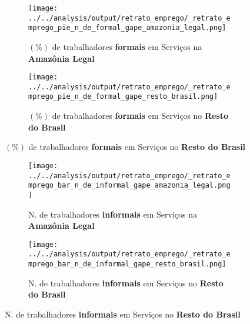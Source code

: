 \documentclass[11pt]{beamer}
\begin{document}
\begin{frame}[label=_retrato_emprego_pie_n_de_formal_gape]{}
\textit{\hyperlink{indice_principal}{}}
\begin{figure}
\centering
\begin{subfigure}{.5\textwidth}
  \centering
  \texttt{[image: ../../analysis/output/retrato\_emprego/\_retrato\_emprego\_pie\_n\_de\_formal\_gape\_amazonia\_legal.png]}
  \label{fig:_retrato_emprego_pie_n_de_formal_gape_amazonia_legal}
  \caption{{\tiny $(\%)$ de trabalhadores \textbf{formais} em Serviços na \textbf{Amazônia Legal}}}
\end{subfigure}%
\begin{subfigure}{.5\textwidth}
  \centering
  \texttt{[image: ../../analysis/output/retrato\_emprego/\_retrato\_emprego\_pie\_n\_de\_formal\_gape\_resto\_brasil.png]}
  \label{fig:_retrato_emprego_pie_n_de_formal_gape_resto_brasil}
   \caption{{\tiny $(\%)$ de trabalhadores \textbf{formais} em Serviços no \textbf{Resto do Brasil}}}
\end{subfigure}
\end{figure}
\end{frame}


\begin{frame}[label=_retrato_emprego_bar_n_de_informal_gape]{}
\textit{\hyperlink{indice_principal}{}}
\begin{figure}
\centering
\begin{subfigure}{.5\textwidth}
  \centering
  \texttt{[image: ../../analysis/output/retrato\_emprego/\_retrato\_emprego\_bar\_n\_de\_informal\_gape\_amazonia\_legal.png]}
  \label{fig:_retrato_emprego_bar_n_de_informal_gape_amazonia_legal}
  \caption{{\tiny N. de trabalhadores \textbf{informais} em Serviços na \textbf{Amazônia Legal}}}
\end{subfigure}%
\begin{subfigure}{.5\textwidth}
  \centering
  \texttt{[image: ../../analysis/output/retrato\_emprego/\_retrato\_emprego\_bar\_n\_de\_informal\_gape\_resto\_brasil.png]}
  \label{fig:_retrato_emprego_bar_n_de_informal_gape_resto_brasil}
   \caption{{\tiny N. de trabalhadores \textbf{informais} em Serviços no \textbf{Resto do Brasil}}}
\end{subfigure}
\end{figure}
\end{frame}
\end{document}
